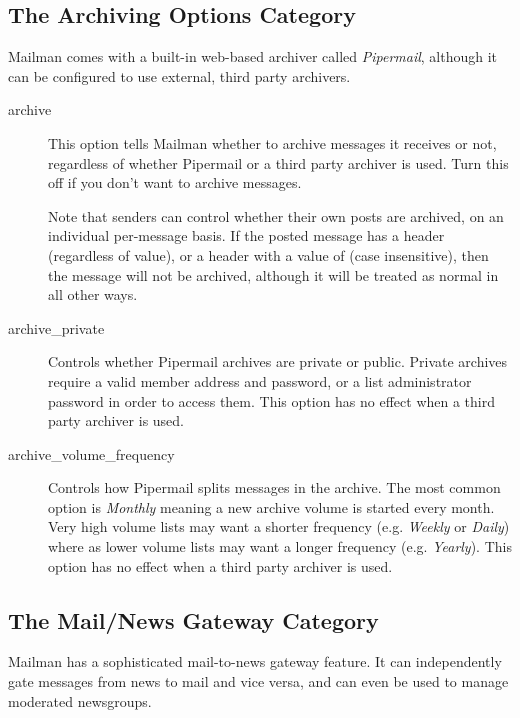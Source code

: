 \documentclass{howto}
\begin{document}
\subsection{The Archiving Options Category}

Mailman comes with a built-in web-based archiver called
\emph{Pipermail}, although it can be configured to use external,
third party archivers.

\begin{description}

\item[archive]
    This option tells Mailman whether to archive messages it receives
    or not, regardless of whether Pipermail or a third party archiver
    is used.  Turn this off if you don't want to archive messages.

    Note that senders can control whether their own posts are
    archived, on an individual per-message basis.  If the posted
    message has a  header (regardless of
    value), or a  header with a value of
     (case insensitive), then the message will not be
    archived, although it will be treated as normal in all other
    ways.

\item[archive_private]
    Controls whether Pipermail archives are private or public.
    Private archives require a valid member address and password, or a
    list administrator password in order to access them.  This
    option has no effect when a third party archiver is used.

\item[archive_volume_frequency]
    Controls how Pipermail splits messages in the archive.  The most
    common option is \emph{Monthly} meaning a new archive volume is
    started every month.  Very high volume lists may want a shorter
    frequency (e.g. \emph{Weekly} or \emph{Daily}) where as lower
    volume lists may want a longer frequency (e.g. \emph{Yearly}).
    This option has no effect when a third party archiver is used.
\end{description}

\subsection{The Mail/News Gateway Category}

Mailman has a sophisticated mail-to-news gateway feature.  It can
independently gate messages from news to mail and vice versa, and can
even be used to manage moderated newsgroups.
\end{document}
